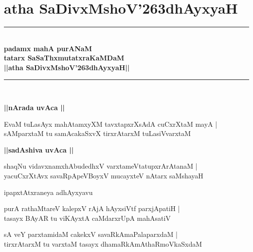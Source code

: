 \documentclass[twoside,12pt,openright]{book}
\def\S{\char'263}
\newcounter{shloka}[chapter]
\def\uvaca#1{\centerline{{\large\textbf{#1}}}}
\begin{document}

\frontmatter

\tableofcontents

\mainmatter
\begin{center}

\end{center}
\chapter{atha SaDivxMshoV\S dhAyxyaH}
\begin{center}
\rule{2cm}{1pt}\\[.5cm]
{\huge\bfseries  padamx mahA purANaM}\\[.3cm]
{\Large\bfseries  tatarx SaSaThxmutatxraKaMDaM }\\[.3cm]
{\LARGE\bfseries ||atha SaDivxMshoV\S dhAyxyaH||}\\[.3cm]
\rule{2cm}{1pt}\\
\end{center}

\uvaca{ ||nArada uvAca ||}

\begin{shloka}%
EvaM tuLasAyx mahAtamxyXM tavxtapxrXsAdA cuCxrXtaM mayA |\\
sAMparxtaM tu samAcakaSxvX tirxrAtarxM tuLasiVvarxtaM
\end{shloka}

\uvaca{||sadAshiva uvAca ||}

\begin{shloka}%
shaqNu vidavxnamxhAbudedhxV varxtameVtatupxrArAtanaM |\\
yacuCxrXtAvx savaRpApeVBoyxV mucayxteV nAtarx saMshayaH
\end{shloka}

\begin{center}
ipapxtAtxraneya adhAyxyavu
\end{center}

\begin{shloka}%
purA rathaMtareV kalepxV rAjA hAyxsiVtf parxjApatiH |\\
tasayx BAyAR tu viKAyxtA caMdarxrUpA mahAsatiV 
\end{shloka}

\begin{shloka}%
sA veY parxtamidaM cakekxV savaRkAmaPalaparxdaM |\\
tirxrAtarxM tu varxtaM tasayx dhamaRkAmAthaRmoVkaSxdaM
\end{shloka}
\end{document}
